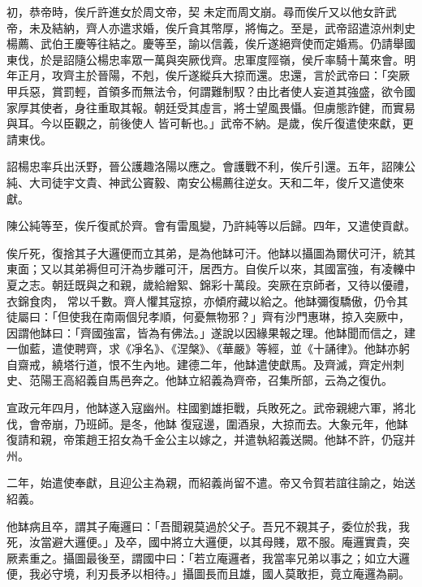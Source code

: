 \begin{pinyinscope}
 初，恭帝時，俟斤許進女於周文帝，契
 未定而周文崩。尋而俟斤又以他女許武帝，未及結納，齊人亦遣求婚，俟斤貪其幣厚，將悔之。至是，武帝詔遣涼州刺史楊薦、武伯王慶等往結之。慶等至，諭以信義，俟斤遂絕齊使而定婚焉。仍請舉國東伐，於是詔隨公楊忠率眾一萬與突厥伐齊。忠軍度陘嶺，侯斤率騎十萬來會。明年正月，攻齊主於晉陽，不剋，俟斤遂縱兵大掠而還。忠還，言於武帝曰：「突厥甲兵惡，賞罰輕，首領多而無法令，何謂難制馭？由比者使人妄道其強盛，欲令國家厚其使者，身往重取其報。朝廷受其虛言，將士望風畏懾。但虜態詐健，而實易與耳。今以臣觀之，前後使人
 皆可斬也。」武帝不納。是歲，俟斤復遣使來獻，更請東伐。



 詔楊忠率兵出沃野，晉公護趣洛陽以應之。會護戰不利，俟斤引還。五年，詔陳公純、大司徒宇文貴、神武公竇毅、南安公楊薦往逆女。天和二年，俊斤又遣使來獻。



 陳公純等至，俟斤復貳於齊。會有雷風變，乃許純等以后歸。四年，又遣使貢獻。



 俟斤死，復捨其子大邏便而立其弟，是為他缽可汗。他缽以攝圖為爾伏可汗，統其東面；又以其弟褥但可汗為步離可汗，居西方。自俟斤以來，其國富強，有凌轢中夏之志。朝廷既與之和親，歲給繒絮、錦彩十萬段。突厥在京師者，又待以優禮，衣錦食肉，
 常以千數。齊人懼其寇掠，亦傾府藏以給之。他缽彌復驕傲，仍令其徒屬曰：「但使我在南兩個兒孝順，何憂無物邪？」齊有沙門惠琳，掠入突厥中，因謂他缽曰：「齊國強富，皆為有佛法。」遂說以因緣果報之理。他缽聞而信之，建一伽藍，遣使聘齊，求《凈名》、《涅槃》、《華嚴》等經，並《十誦律》。他缽亦躬自齋戒，繞塔行道，恨不生內地。建德二年，他缽遣使獻馬。及齊滅，齊定州刺史、范陽王高紹義自馬邑奔之。他缽立紹義為齊帝，召集所部，云為之復仇。



 宣政元年四月，他缽遂入寇幽州。柱國劉雄拒戰，兵敗死之。武帝親總六軍，將北伐，會帝崩，乃班師。是冬，他缽
 復寇邊，圍酒泉，大掠而去。大象元年，他缽復請和親，帝策趙王招女為千金公主以嫁之，并遣執紹義送闕。他缽不許，仍寇并州。



 二年，始遣使奉獻，且迎公主為親，而紹義尚留不遣。帝又令賀若誼往諭之，始送紹義。



 他缽病且卒，謂其子庵邏曰：「吾聞親莫過於父子。吾兄不親其子，委位於我，我死，汝當避大邏便。」及卒，國中將立大邏便，以其母賤，眾不服。庵邏實貴，突厥素重之。攝圖最後至，謂國中曰：「若立庵邏者，我當率兄弟以事之；如立大邏便，我必守境，利刃長矛以相待。」攝圖長而且雄，國人莫敢拒，竟立庵邏為嗣。




\end{pinyinscope}
